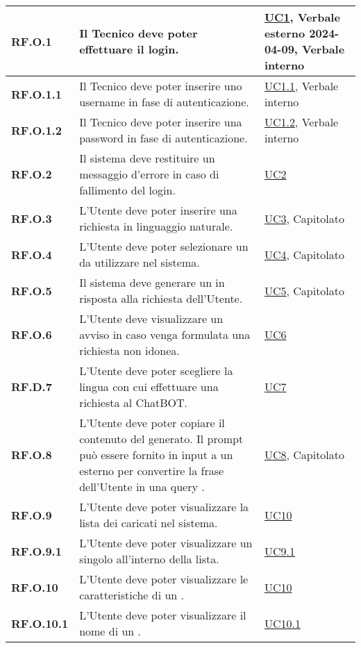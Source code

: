 \begin{adjustwidth}{-0.5cm}{-0.5cm}
\begin{longtable}{|P{3cm}|P{6,5cm}|>{\arraybackslash}P{4cm}|}
    \textbf{RF.O.1} & Il Tecnico deve poter effettuare il login. & \hyperref[UC1]{UC1}, Verbale esterno 2024-04-09, Verbale interno\\
    \hline
    \textbf{RF.O.1.1} & Il Tecnico deve poter inserire uno username in fase di autenticazione. & \hyperref[UC1point1]{UC1.1}, Verbale interno\\
    \hline
    \textbf{RF.O.1.2} & Il Tecnico deve poter inserire una password in fase di autenticazione. & \hyperref[UC1point2]{UC1.2}, Verbale interno\\
    \hline
    \textbf{RF.O.2} & Il sistema deve restituire un messaggio d'errore in caso di fallimento del login. & \hyperref[UC2]{UC2}\\
    \hline
    \textbf{RF.O.3} & L'Utente deve poter inserire una richiesta in linguaggio naturale. & \hyperref[UC3]{UC3}, Capitolato\\
    \hline
    \textbf{RF.O.4} & L'Utente deve poter selezionare un  da utilizzare nel sistema. & \hyperref[UC4]{UC4}, Capitolato\\
    \hline
    \textbf{RF.O.5} & Il sistema deve generare un  in risposta alla richiesta dell'Utente. & \hyperref[UC5]{UC5}, Capitolato\\
    \hline
    \textbf{RF.O.6} & L'Utente deve visualizzare un avviso in caso venga formulata una richiesta non idonea. & \hyperref[UC6]{UC6}\\
    \hline
    \textbf{RF.D.7} & L'Utente deve poter scegliere la lingua con cui effettuare una richiesta al ChatBOT. & \hyperref[UC7]{UC7}\\
    \hline
    \textbf{RF.O.8} & L'Utente deve poter copiare il contenuto del  generato. Il prompt può essere fornito in input a un  esterno per convertire la frase dell'Utente in una query . & \hyperref[UC8]{UC8}, Capitolato\\
    \hline
    \textbf{RF.O.9} & L'Utente deve poter visualizzare la lista dei  caricati nel sistema. & \hyperref[UC10]{UC10}\\
    \hline
    \textbf{RF.O.9.1} & L'Utente deve poter visualizzare un singolo  all'interno della lista. & \hyperref[UC9point1]{UC9.1}\\
    \hline
    \textbf{RF.O.10} & L'Utente deve poter visualizzare le caratteristiche di un . & \hyperref[UC10]{UC10}\\
    \hline
    \textbf{RF.O.10.1} & L'Utente deve poter visualizzare il nome di un . & \hyperref[UC10point1]{UC10.1}\\

\end{longtable}
\end{adjustwidth}
